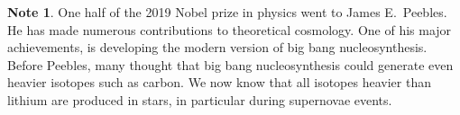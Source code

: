 \documentclass[a4paper,12pt]{article}
\theoremstyle{remark}
\renewcommand{\=}[1]{\stackrel{#1}{=}} %
\theoremstyle{plain}
\theoremstyle{definition}
\newtheorem*{definitionT}{Note}%
\newenvironment{note}{
\begin{dBox}
\begin{definitionT}}
{\end{definitionT}
\end{dBox}}
\begin{document}
\begin{note}
One half of the 2019 Nobel prize in physics went to James E.\ Peebles. He has made numerous contributions to theoretical cosmology. One of his major achievements, is developing the modern version of big bang nucleosynthesis. Before Peebles, many thought that big bang nucleosynthesis could generate even heavier isotopes such as carbon. We now know that all isotopes heavier than lithium are produced in stars, in particular during supernovae events. 
\end{note}





\begingroup
%
%

%
\linespread{0.5}\selectfont

\endgroup
\end{document}
